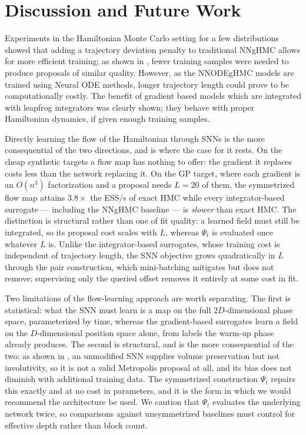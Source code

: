 \documentclass{article}
\theoremstyle{plain}
\theoremstyle{definition}
\theoremstyle{remark}
\begin{document}
\section{Discussion and Future Work}
Experiments in the Hamiltonian Monte Carlo setting for a few distributions showed that adding a trajectory deviation penalty to traditional NNgHMC \cite{Li_2019} allows for more efficient training; as shown in , fewer training samples were needed to produce proposals of similar quality. However, as the NNODEgHMC models are trained using Neural ODE methods, longer trajectory length could prove to be computationally costly. The benefit of gradient based models which are integrated with leapfrog integrators was clearly shown; they behave with proper Hamiltonian dynamics, if given enough training samples.

Directly learning the flow of the Hamiltonian through SNNs is the more
consequential of the two directions, and  is where the case for
it rests. On the cheap synthetic targets a flow map has nothing to offer: the
gradient it replaces costs less than the network replacing it. On the GP
target, where each gradient is an $O(n^3)$ factorization and a proposal needs
$L = 20$ of them, the symmetrized flow map attains $3.8\times$ the ESS/s of
exact HMC while every integrator-based surrogate --- including the NNgHMC
baseline --- is \emph{slower} than exact HMC. The distinction is structural
rather than one of fit quality: a learned field must still be integrated, so
its proposal cost scales with $L$, whereas $\Psi_t$ is evaluated once whatever
$L$ is. Unlike the integrator-based surrogates, whose training cost is
independent of trajectory length, the SNN objective grows quadratically in $L$
through the pair construction, which mini-batching mitigates but does not
remove; supervising only the queried offset removes it entirely at some cost
in fit.

Two limitations of the flow-learning approach are worth separating. The first
is statistical: what the SNN must learn is a map on the full $2D$-dimensional
phase space, parameterized by time, whereas the gradient-based surrogates learn
a field on the $D$-dimensional position space alone, from labels the warm-up
phase already produces. The second is structural, and is the more consequential
of the two: as shown in , an unmodified SNN supplies
volume preservation but not involutivity, so it is not a valid Metropolis
proposal at all, and its bias does not diminish with additional training data.
The symmetrized construction $\Psi_t$ repairs this exactly and at no cost in
parameters, and it is the form in which we would recommend the architecture be
used. We caution that $\Psi_t$ evaluates the underlying network twice, so
comparisons against unsymmetrized baselines must control for effective depth
rather than block count.
\end{document}
